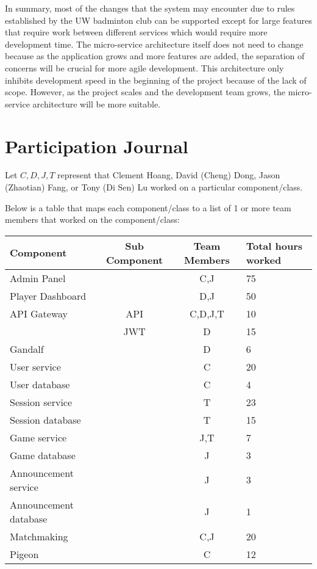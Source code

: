 \documentclass{article}
\begin{document}
In summary, most of the changes that the system may encounter due to rules established by the UW badminton club can be supported except for large features that require work between different services which would require more development time. The micro-service architecture itself does not need to change because as the application grows and more features are added, the separation of concerns will be crucial for more agile development. This architecture only inhibits development speed in the beginning of the project because of the lack of scope. However, as the project scales and the development team grows, the micro-service architecture will be more suitable.

\newpage



\newpage
\section{Participation Journal}
Let $C,D,J,T$ represent that Clement Hoang, David (Cheng) Dong, Jason (Zhaotian) Fang, or Tony (Di Sen) Lu worked on a particular component/class.

Below is a table that maps each component/class to a list of 1 or more team members that worked on the component/class: \\
\begin{tabular}{ | l | c | c | l |  }
	\hline
    Component & Sub Component & Team Members & Total hours worked \\
    \hline
	Admin Panel & & C,J & 75 \\
	\hline
	Player Dashboard & & D,J & 50  \\
	\hline
	API Gateway & API & C,D,J,T & 10 \\
	& JWT & D & 15 \\
	\hline
	Gandalf & & D & 6  \\
	\hline
	User service & & C & 20 \\
	User database & & C & 4 \\
	\hline
	Session service & & T & 23 \\
	Session database & & T & 15 \\
	\hline
	Game service & & J,T & 7 \\
	Game database & & J & 3 \\
	\hline
	Announcement service & & J & 3 \\
	Announcement database & & J & 1 \\
	\hline
	Matchmaking & & C,J & 20 \\
	\hline
	Pigeon & & C & 12 \\
    \hline
\end{tabular} \\ \\
\end{document}
